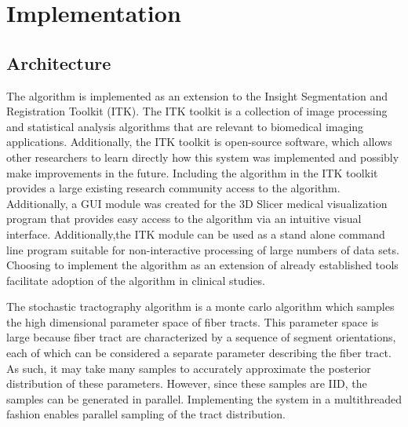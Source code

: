 \chapter{Implementation}
\section{Architecture}
The algorithm is implemented as an extension to the Insight Segmentation and Registration Toolkit (ITK).  The ITK toolkit is a collection of image processing and statistical analysis algorithms that are relevant to biomedical imaging applications.  Additionally, the ITK toolkit is open-source software, which allows other researchers to learn directly how this system was implemented and possibly make improvements in the future.  Including the algorithm in the ITK toolkit provides a large existing research community access to the algorithm.  Additionally, a GUI module was created for the 3D Slicer medical visualization program that provides easy access to the algorithm via an intuitive visual interface.  Additionally,the ITK module can be used as a stand alone command line program suitable for non-interactive processing of large numbers of data sets.  Choosing to implement the algorithm as an extension of already established tools facilitate adoption of the algorithm in clinical studies.

The stochastic tractography algorithm is a monte carlo algorithm which samples the high dimensional parameter space of fiber tracts.  This parameter space is large because fiber tract are characterized by a sequence of segment orientations, each of which can be considered a separate parameter describing the fiber tract.  As such, it may take many samples to accurately approximate the posterior distribution of these parameters.  However, since these samples are IID, the samples can be generated in parallel.  Implementing the system in a multithreaded fashion enables parallel sampling of the tract distribution.

